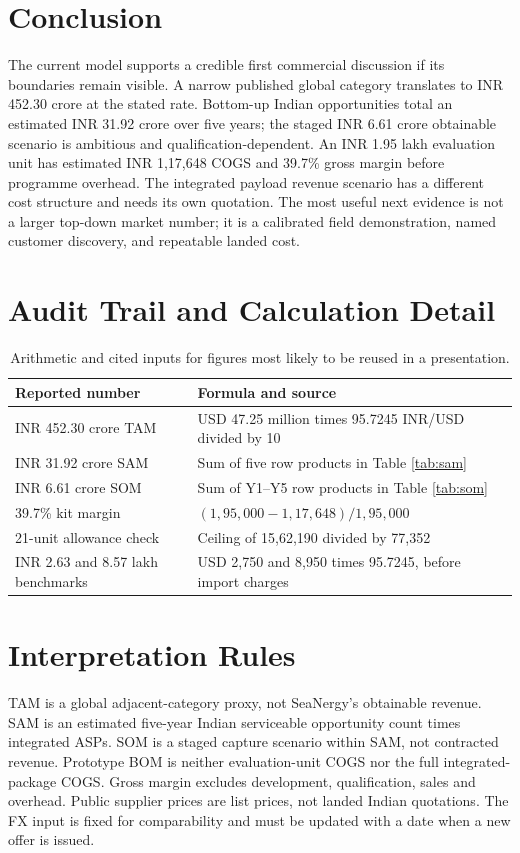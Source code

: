 \documentclass[11pt,a4paper]{article}
\begin{document}
\section{Conclusion}
The current model supports a credible first commercial discussion if its boundaries remain visible. A narrow published global category translates to INR 452.30 crore at the stated rate. Bottom-up Indian opportunities total an estimated INR 31.92 crore over five years; the staged INR 6.61 crore obtainable scenario is ambitious and qualification-dependent. An INR 1.95 lakh evaluation unit has estimated INR 1,17,648 COGS and 39.7\% gross margin before programme overhead. The integrated payload revenue scenario has a different cost structure and needs its own quotation. The most useful next evidence is not a larger top-down market number; it is a calibrated field demonstration, named customer discovery, and repeatable landed cost.

\appendix
\section{Audit Trail and Calculation Detail}
\begin{table}[htbp]\centering
\begin{tabularx}{\textwidth}{@{}p{}Y@{}}
\toprule
Reported number & Formula and source\\ \midrule
INR 452.30 crore TAM & USD 47.25 million times 95.7245 INR/USD divided by 10 \cite{diresearch,fx}\\
INR 31.92 crore SAM & Sum of five row products in Table \ref{tab:sam} \cite{workbook}\\
INR 6.61 crore SOM & Sum of Y1--Y5 row products in Table \ref{tab:som} \cite{workbook}\\
39.7\% kit margin & $(1,95,000-1,17,648)/1,95,000$ \cite{workbook}\\
21-unit allowance check & Ceiling of 15,62,190 divided by 77,352\\
INR 2.63 and 8.57 lakh benchmarks & USD 2,750 and 8,950 times 95.7245, before import charges \cite{ping,echo,fx}\\ \bottomrule
\end{tabularx}
\caption{Arithmetic and cited inputs for figures most likely to be reused in a presentation.}
\end{table}

\section{Interpretation Rules}
TAM is a global adjacent-category proxy, not SeaNergy's obtainable revenue. SAM is an estimated five-year Indian serviceable opportunity count times integrated ASPs. SOM is a staged capture scenario within SAM, not contracted revenue. Prototype BOM is neither evaluation-unit COGS nor the full integrated-package COGS. Gross margin excludes development, qualification, sales and overhead. Public supplier prices are list prices, not landed Indian quotations. The FX input is fixed for comparability and must be updated with a date when a new offer is issued.
\end{document}
